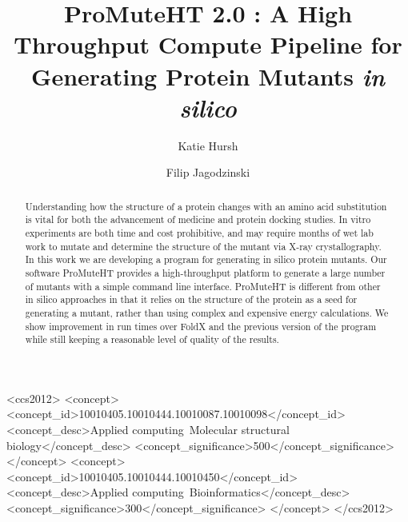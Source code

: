 \documentclass[sigconf]{acmart}
\begin{document}
\title{ProMuteHT 2.0 : A High Throughput Compute Pipeline for Generating
  Protein Mutants \textit{in silico}}

\author{Katie Hursh}

\author{Filip Jagodzinski}

\renewcommand{\shorttitle}{ProMuteHT 2.0}


\begin{abstract}
Understanding how the structure of a protein changes with an amino acid substitution is vital for both the advancement of medicine and protein docking studies. In vitro experiments are both time and cost prohibitive, and may require months of wet lab work to mutate and determine the structure of the mutant via X-ray crystallography. In this work we are developing a program for generating in silico protein mutants. Our software ProMuteHT provides a high-throughput platform to generate a large number of mutants with a simple command line interface. ProMuteHT is different from other in silico approaches in that it relies on the structure of the protein as a seed for generating a mutant, rather than using complex and expensive energy calculations.  We show improvement in run times over FoldX and the previous version of the program while still keeping a reasonable level of quality of the results.
\end{abstract}

%
%
\begin{CCSXML}
<ccs2012>
<concept>
<concept_id>10010405.10010444.10010087.10010098</concept_id>
<concept_desc>Applied computing~Molecular structural biology</concept_desc>
<concept_significance>500</concept_significance>
</concept>
<concept>
<concept_id>10010405.10010444.10010450</concept_id>
<concept_desc>Applied computing~Bioinformatics</concept_desc>
<concept_significance>300</concept_significance>
</concept>
</ccs2012>
\end{CCSXML}

\end{document}
